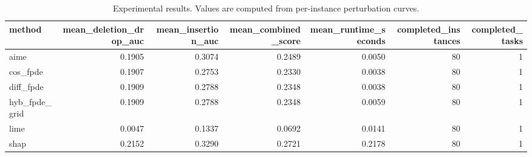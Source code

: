 \begin{table}[t]
\caption{Experimental results. Values are computed from per-instance perturbation curves.}
\label{tab:main_results_computed}
\centering
\begin{tabular}{lrrrrrr}
\toprule
method & mean\_deletion\_drop\_auc & mean\_insertion\_auc & mean\_combined\_score & mean\_runtime\_seconds & completed\_instances & completed\_tasks \\
\midrule
aime & 0.1905 & 0.3074 & 0.2489 & 0.0050 & 80 & 1 \\
cos\_fpde & 0.1907 & 0.2753 & 0.2330 & 0.0038 & 80 & 1 \\
diff\_fpde & 0.1909 & 0.2788 & 0.2348 & 0.0038 & 80 & 1 \\
hyb\_fpde\_grid & 0.1909 & 0.2788 & 0.2348 & 0.0059 & 80 & 1 \\
lime & 0.0047 & 0.1337 & 0.0692 & 0.0141 & 80 & 1 \\
shap & 0.2152 & 0.3290 & 0.2721 & 0.2178 & 80 & 1 \\
\bottomrule
\end{tabular}

\end{table}
